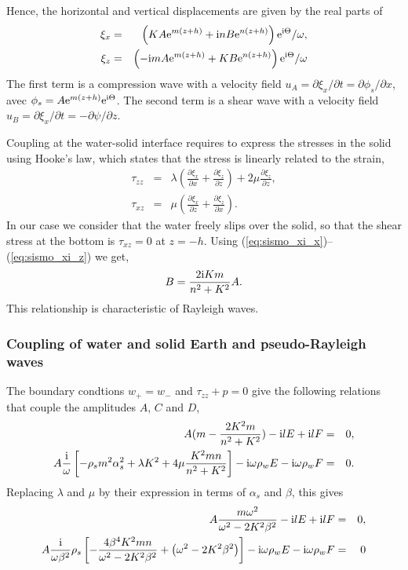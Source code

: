 Hence, the horizontal and vertical displacements are given by the real parts of 
\begin{eqnarray}
\xi_x &=&  \left(K A  \mathrm{e}^{m(z+h)}      + \mathrm{i} n B  \mathrm{e}^{n(z+h)}\right)  \mathrm{e}^{\mathrm{i} \Theta} \label{eq:sismo_xi_x}/\omega, \\
\xi_z &=&    \left(- \mathrm{i} m A  \mathrm{e}^{m(z+h)} +  K B  \mathrm{e}^{n(z+h)} \right) \mathrm{e}^{\mathrm{i} \Theta} /\omega \label{eq:sismo_xi_z}
\end{eqnarray}
The first term is a compression wave with a velocity field
$u_A =\partial \xi_x /\partial t = \partial \phi_s / \partial x$, 
avec $\phi_s =  A \mathrm{e}^{m(z+h)}\mathrm{e}^{\mathrm{i} \Theta} $. 
The second term is a shear wave with a velocity field 
$u_B =\partial \xi_x /\partial t = -\partial \psi / \partial z$. 


Coupling at the water-solid interface requires to express the stresses in the solid using Hooke's law, which states that the 
stress is linearly related to the strain,
\begin{eqnarray}
\tau_{zz}   &=& \lambda \left(\frac{\partial \xi_x}{\partial x} + \frac{\partial \xi_z}{\partial z}\right) + 2 \mu \frac{\partial \xi_z}{\partial z}, \\
\tau_{xz}   &=& \mu  \left(\frac{\partial \xi_x}{\partial z} + \frac{\partial \xi_z}{\partial x}\right).
\end{eqnarray}
In our case we consider that the water freely slips over the solid, so that the shear stress 
at the bottom is  $\tau_{xz} = 0$ at $z=-h$. Using  (\ref{eq:sismo_xi_x})--(\ref{eq:sismo_xi_z}) we get, 
\begin{eqnarray}
 B= \frac{2 \mathrm{i} K m}{n^2+K^2} A.
\end{eqnarray}
This relationship is characteristic of Rayleigh waves. 

\subsubsection{Coupling of water and solid Earth and pseudo-Rayleigh waves}
The boundary condtions $w_+=  w_-$ and $\tau_{zz} + p=0$ give the following relations that couple the amplitudes  
$A$, $C$ and $D$, 
\begin{eqnarray}
 A   (m - \frac{2 K^2 m}{n^2+K^2}) - \mathrm{i} l E + \mathrm{i} l F &= &0, \\
 A \frac{\mathrm{i}}{\omega} \left[ - \rho_s  m^2 \alpha_s^2  
             + \lambda  K^2 + 4 \mu \frac{K^2 m n}{n^2+K^2} \right] - \mathrm{i} \omega  {\rho_w} E - \mathrm{i} \omega {\rho_w} F &=& 0.
\end{eqnarray}
Replacing $\lambda$ and $\mu$ by their expression in terms of  $\alpha_s$ and $\beta$, this gives
\begin{eqnarray}
 A   \frac{m \omega^2}{\omega^2-2K^2 \beta^2} - \mathrm{i} l E + \mathrm{i} l F &= &0, \\
  A \frac{\mathrm{i}}{\omega \beta^2} \rho_s\left[- \frac{4 \beta^4 K^2 m n}{\omega^2- 2K^2 \beta^2} + \left(\omega^2- 2K^2 \beta^2 \right)\right]
 - \mathrm{i} \omega  \rho_w E - \mathrm{i} \omega \rho_w F &=& 0 
\end{eqnarray}

